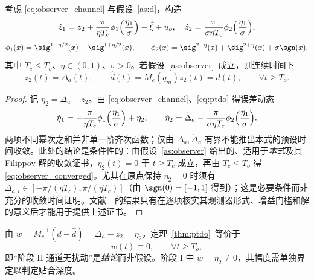 \begin{theorem}[预设时间扰动观测器]\label{thm:ptdo}
考虑 \eqref{eq:observer_channel} 与假设~\ref{as:d}，构造
\begin{equation}
\dot z_1=z_2+\frac{\pi}{\eta T_c}\phi_1\Bigl(\frac{\eta_1}{\sigma}\Bigr)-\dot{\bar\xi}+u_o,\quad
\dot z_2=\frac{\pi}{\sigma\eta T_c}\phi_2\Bigl(\frac{\eta_1}{\sigma}\Bigr),
\label{eq:ptdo}
\end{equation}
\begin{equation}
\phi_1(x)=\sig^{1-\eta/2}(x)+\sig^{1+\eta/2}(x),\qquad
\phi_2(x)=\sig^{2-\eta}(x)+\sig^{2+\eta}(x)+\sigma\sgn(x),
\label{eq:phi}
\end{equation}
其中 \(T_c\le T_o\)、\(\eta\in(0,1)\)、\(\sigma>0\)。若假设~\ref{as:observer}~成立，则连续时间下
\begin{equation}
z_2(t)=\Delta_a(t),\qquad \hat d(t)=M_e(q_m)z_2(t)=d(t),\qquad \forall t\ge T_o .
\label{eq:observer_converged}
\end{equation}
\end{theorem}

\begin{proof}
记 \(\eta_2=\Delta_a-z_2\)。由 \eqref{eq:observer_channel}、\eqref{eq:ptdo} 得误差动态
\begin{equation}
\dot\eta_1=-\frac{\pi}{\eta T_c}\phi_1\Bigl(\frac{\eta_1}{\sigma}\Bigr)+\eta_2,\qquad
\dot\eta_2=\dot\Delta_a-\frac{\pi}{\sigma\eta T_c}\phi_2\Bigl(\frac{\eta_1}{\sigma}\Bigr).
\label{eq:observer_errordyn}
\end{equation}
两项不同幂次之和并非单一阶齐次函数；仅由 \(\Delta_a,\dot\Delta_a\) 有界不能推出本式的预设时间收敛。此处的结论是条件性的：由假设~\ref{as:observer} 给出的、适用于\emph{本式}及其 Filippov 解的收敛证书，\(\eta_2(t)=0\) 于 \(t\ge T_c\) 成立，再由 \(T_c\le T_o\) 得 \eqref{eq:observer_converged}。尤其在原点保持 \(\eta_2=0\) 时须有 \(\dot\Delta_{a,i}\in[-\pi/(\eta T_c),\pi/(\eta T_c)]\)（由 \(\sgn(0)=[-1,1]\) 得到）；这是必要条件而非充分的收敛时间证明。文献~\cite{jiangPrescribedtimeDisturbanceObserver2024}~的结果只有在逐项核实其观测器形式、增益门槛和解的意义后才能用于提供上述证书。
\end{proof}

由 \(w=M_e^{-1}(d-\hat d)=\Delta_a-z_2=\eta_2\)，定理~\ref{thm:ptdo}~等价于
\begin{equation}
w(t)\equiv0,\qquad \forall t\ge T_o ,
\label{eq:w_zero}
\end{equation}
即“阶段 II 通道无扰动”是\emph{结论}而非假设。阶段 I 中 \(w=\eta_2\neq0\)，其幅度需单独界定以判定贴合深度。

